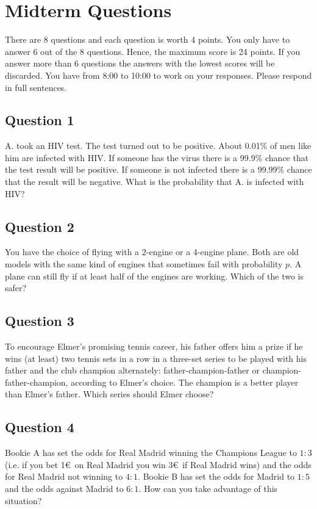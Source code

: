 \section{Midterm Questions}
There are 8 questions and each question is worth 4 points. You only have to answer 6 out of the 8 questions. Hence, the maximum score is 24 points. If you answer more than 6 questions the answers with the lowest scores will be discarded. You have from 8:00 to 10:00 to work on your responses. Please respond in full sentences.

\subsection*{Question 1}
A. took an HIV test. The test turned out to be positive. About 0.01\% of men like him are infected with HIV. If someone has the virus there is a 99.9\% chance that the test result will be positive. If someone is not infected there is a 99.99\% chance that the result will be negative. What is the probability that A. is infected with HIV?

\subsection*{Question 2}
You have the choice of flying with a 2-engine or a 4-engine plane. Both are old models with the same kind of engines that sometimes fail with probability $p$. A plane can still fly if at least half of the engines are working. Which of the two is safer?

\subsection*{Question 3}
To encourage Elmer's promising tennis career, his father offers him a prize if he wins (at least) two tennis sets in a row in a three-set series to be played with his father and the club champion alternately: father-champion-father or champion-father-champion, according to Elmer's choice. The champion is a better player than Elmer's father. Which series should Elmer choose?

\subsection*{Question 4}
Bookie A has set the odds for Real Madrid winning the Champions League to $1:3$ (i.e. if you bet 1\euro\ on Real Madrid you win 3\euro\ if Real Madrid wins) and the odds for Real Madrid not winning to $4:1$. Bookie B has set the odds for Madrid to $1:5$ and the odds against Madrid to $6:1$. How can you take advantage of this situation?

